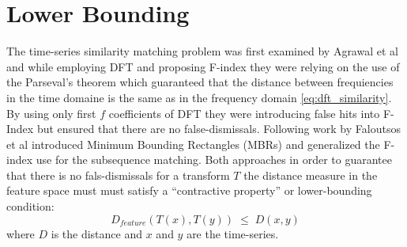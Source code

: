 \section{Lower Bounding}
The time-series similarity matching problem was first examined by Agrawal et al \cite{citeulike:3973409} and while employing DFT and proposing F-index they were relying on the use of the Parseval's theorem which guaranteed that the distance between frequiencies in the time domaine is the same as in the frequency domain \ref{eq:dft_similarity}. By using only first $f$ coefficients of DFT they were introducing false hits into F-Index but ensured that there are no false-dismissals. Following work by Faloutsos et al \cite{citeulike:825581} introduced Minimum Bounding Rectangles (MBRs) and generalized the F-index use for the subsequence matching. Both approaches in order to guarantee that there is no fals-dismissals for a transform $T$ the distance measure in the feature space must must satisfy a ``contractive property'' or lower-bounding condition:
\begin{equation}
D_{feature}(T(x),T(y)) \; \leq \; D(x,y) 
\label{eq:bounding}
\end{equation}
where $D$ is the distance and $x$ and $y$ are the time-series.